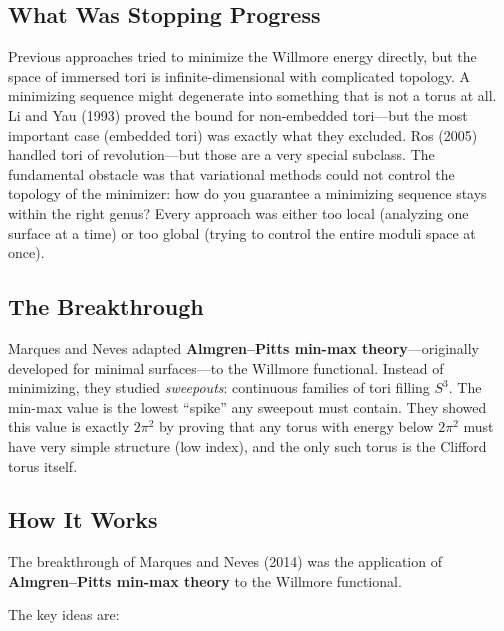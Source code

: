 \subsection{What Was Stopping Progress}

Previous approaches tried to minimize the Willmore energy directly, but the space of immersed tori is infinite-dimensional with complicated topology. A minimizing sequence might degenerate into something that is not a torus at all. Li and Yau (1993) proved the bound for non-embedded tori---but the most important case (embedded tori) was exactly what they excluded. Ros (2005) handled tori of revolution---but those are a very special subclass. The fundamental obstacle was that variational methods could not control the topology of the minimizer: how do you guarantee a minimizing sequence stays within the right genus? Every approach was either too local (analyzing one surface at a time) or too global (trying to control the entire moduli space at once).

\subsection{The Breakthrough}

Marques and Neves adapted \textbf{Almgren--Pitts min-max theory}---originally developed for minimal surfaces---to the Willmore functional. Instead of minimizing, they studied \emph{sweepouts}: continuous families of tori filling $S^3$. The min-max value is the lowest ``spike'' any sweepout must contain. They showed this value is exactly $2\pi^2$ by proving that any torus with energy below $2\pi^2$ must have very simple structure (low index), and the only such torus is the Clifford torus itself.

\subsection{How It Works}

The breakthrough of Marques and Neves (2014) \cite{marquesneves2014} was the application of \textbf{Almgren--Pitts min-max theory} to the Willmore functional.

The key ideas are:

